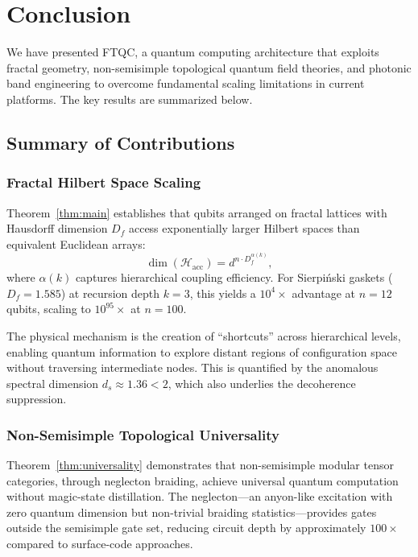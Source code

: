 
\section{Conclusion}
\label{sec:conclusion}

We have presented FTQC, a quantum computing architecture that exploits fractal geometry, non-semisimple topological quantum field theories, and photonic band engineering to overcome fundamental scaling limitations in current platforms. The key results are summarized below.

\subsection{Summary of Contributions}

\subsubsection{Fractal Hilbert Space Scaling}

Theorem~\ref{thm:main} establishes that qubits arranged on fractal lattices with Hausdorff dimension $D_f$ access exponentially larger Hilbert spaces than equivalent Euclidean arrays:
\begin{equation}
\dim(\mathcal{H}_{\mathrm{acc}}) = d^{n \cdot D_f^{\alpha(k)}},
\end{equation}
where $\alpha(k)$ captures hierarchical coupling efficiency. For Sierpi\'{n}ski gaskets ($D_f = 1.585$) at recursion depth $k = 3$, this yields a $10^4\times$ advantage at $n = 12$ qubits, scaling to $10^{95}\times$ at $n = 100$.

The physical mechanism is the creation of ``shortcuts'' across hierarchical levels, enabling quantum information to explore distant regions of configuration space without traversing intermediate nodes. This is quantified by the anomalous spectral dimension $d_s \approx 1.36 < 2$, which also underlies the decoherence suppression.

\subsubsection{Non-Semisimple Topological Universality}

Theorem~\ref{thm:universality} demonstrates that non-semisimple modular tensor categories, through neglecton braiding, achieve universal quantum computation without magic-state distillation. The neglecton—an anyon-like excitation with zero quantum dimension but non-trivial braiding statistics—provides gates outside the semisimple gate set, reducing circuit depth by approximately $100\times$ compared to surface-code approaches.

